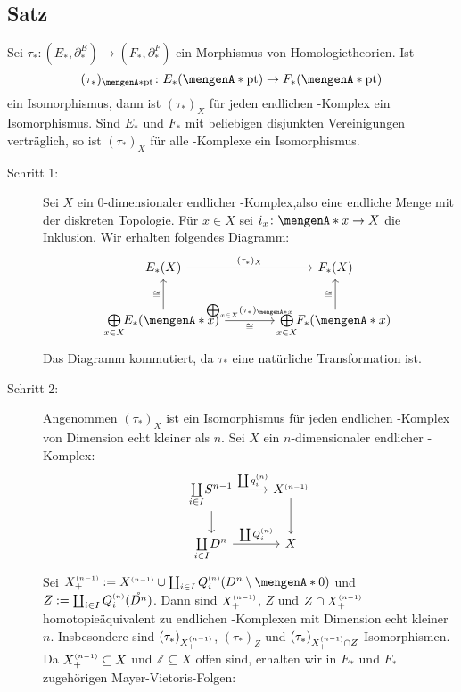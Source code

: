 \subsection[Satz: Isomorphie der Homologie von \CW-Komplexen von zwei Homologietheorien]{Satz} %
\label{sub:149}
Sei $\tau_* \colon (E_*,\partial_*^E) \to (F_*,\partial_*^F)$ ein Morphismus von Homologietheorien. Ist 
\[
	(\tau_*)_{\set{\mathrm{pt}}} \colon E_*(\set{\mathrm{pt}}) \to F_*(\set{\mathrm{pt}}) 
\]
ein Isomorphismus, dann ist $(\tau_*)_X$ für jeden endlichen \CW-Komplex ein 
Isomorphismus. Sind $E_*$ und $F_*$ mit beliebigen disjunkten Vereinigungen verträglich, so ist $(\tau_*)_X$ für alle \CW-Komplexe ein Isomorphismus.
\begin{description}
	\item[Schritt 1:] Sei $X$ ein $0$-dimensionaler endlicher \CW-Komplex,also eine endliche Menge mit der diskreten Topologie. Für $x \in X$ sei $i_x \colon \set{x} \to X$
	die Inklusion. Wir erhalten folgendes Diagramm:
	\[
		\begin{tikzcd}[column sep=4em, row sep=2.5em]
			E_*(X) \rar["(\tau_*)_X"] & F_*(X) \\
			\bigoplus\limits_{\mathclap{x \in X}} E_*(\set{x}) \uar["\cong"] \rar["\bigoplus_{x \in X} (\tau_*)_{\set{x}}","\cong"'] 
			& \bigoplus\limits_{\mathclap{x \in X}} F_*(\set{x}) \uar["\cong"]
		\end{tikzcd}
	\]
	Das Diagramm kommutiert, da $\tau_*$ eine natürliche Transformation ist.
	\item[Schritt 2:] Angenommen $(\tau_*)_X$ ist ein Isomorphismus für jeden endlichen \CW-Komplex von Dimension echt kleiner als $n$. Sei $X$ ein $n$-dimensionaler
	endlicher \CW-Komplex:
	\[
		\begin{tikzcd}
			\coprod\limits_{\mathclap{i \in I}} S^{n-1} \rar["\coprod q_i^\ssbrace{n}"] \dar & X^\ssbrace{n-1} \dar\\
			\coprod\limits_{\mathclap{i \in I}} D^{n} \rar["\coprod Q_i^\ssbrace{n}"] & X
		\end{tikzcd}
	\]
	Sei $X_+^\ssbrace{n-1} := X^\ssbrace{n-1} \cup \coprod_{i \in I} Q_i^\ssbrace{n} \enbrace*{D^n \setminus \set{0}}$ und 
	$Z := \coprod_{i \in I} Q_i^{\scriptscriptstyle(n)}(\mathring{D^n})$. Dann sind $X_+^{\scriptscriptstyle(n-1)}$, $Z$ und $Z\cap X_+^{\scriptscriptstyle(n-1)}$ homotopieäquivalent zu endlichen \CW-Komplexen
	mit Dimension echt kleiner $n$. Insbesondere sind $(\tau_*)_{X_+^{\scriptscriptstyle(n-1)}}$, $(\tau_*)_Z$ und $(\tau_*)_{X^{\scriptscriptstyle(n-1)}_+ \cap Z}$ Isomorphismen. Da
	$X^{\scriptscriptstyle(n-1)}_+ \subseteq X$ und $\mathds{Z} \subseteq X$ offen sind, erhalten wir in $E_*$ und $F_*$ zugehörigen Mayer-Vietoris-Folgen:

\end{description}
